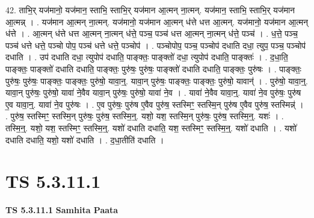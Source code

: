 \documentclass[17pt]{extarticle}
\begin{document}
42. ताभि॒र् यज॑मानो॒ यज॑मान॒ स्ताभि॒ स्ताभि॒र् यज॑मान आ॒त्मन् ना॒त्मन्. यज॑मान॒ स्ताभि॒ स्ताभि॒र् यज॑मान आ॒त्मन्न् । . यज॑मान आ॒त्मन् ना॒त्मन्. यज॑मानो॒ यज॑मान आ॒त्मन् ध॑त्ते धत्त आ॒त्मन्. यज॑मानो॒ यज॑मान आ॒त्मन् ध॑त्ते । . आ॒त्मन् ध॑त्ते धत्त आ॒त्मन् ना॒त्मन् ध॑त्ते॒ पञ्च॒ पञ्च॑ धत्त आ॒त्मन् ना॒त्मन् ध॑त्ते॒ पञ्च॑ । . ध॒त्ते॒ पञ्च॒ पञ्च॑ धत्ते धत्ते॒ पञ्चो पोप॒ पञ्च॑ धत्ते धत्ते॒ पञ्चोप॑ । . पञ्चोपोप॒ पञ्च॒ पञ्चोप॑ दधाति दधा॒ त्युप॒ पञ्च॒ पञ्चोप॑ दधाति । . उप॑ दधाति दधा॒ त्युपोप॑ दधाति॒ पाङ्क्तः॒ पाङ्क्तो॑ दधा॒ त्युपोप॑ दधाति॒ पाङ्क्तः॑ । . द॒धा॒ति॒ पाङ्क्तः॒ पाङ्क्तो॑ दधाति दधाति॒ पाङ्क्तः॒ पुरु॑षः॒ पुरु॑षः॒ पाङ्क्तो॑ दधाति दधाति॒ पाङ्क्तः॒ पुरु॑षः । . पाङ्क्तः॒ पुरु॑षः॒ पुरु॑षः॒ पाङ्क्तः॒ पाङ्क्तः॒ पुरु॑षो॒ यावा॒न्॒. यावा॒न् पुरु॑षः॒ पाङ्क्तः॒ पाङ्क्तः॒ पुरु॑षो॒ यावान्॑ । . पुरु॑षो॒ यावा॒न्॒. यावा॒न् पुरु॑षः॒ पुरु॑षो॒ यावा॑ ने॒वैव यावा॒न् पुरु॑षः॒ पुरु॑षो॒ यावा॑ ने॒व । . यावा॑ ने॒वैव यावा॒न्॒. यावा॑ ने॒व पुरु॑षः॒ पुरु॑ष ए॒व यावा॒न्॒. यावा॑ ने॒व पुरु॑षः । . ए॒व पुरु॑षः॒ पुरु॑ष ए॒वैव पुरु॑ष॒ स्तस्मिꣳ॒॒ स्तस्मि॒न् पुरु॑ष ए॒वैव पुरु॑ष॒ स्तस्मिन्न्॑ । . पुरु॑ष॒ स्तस्मिꣳ॒॒ स्तस्मि॒न् पुरु॑षः॒ पुरु॑ष॒ स्तस्मि॒न्॒. यशो॒ यश॒ स्तस्मि॒न् पुरु॑षः॒ पुरु॑ष॒ स्तस्मि॒न्॒. यशः॑ । . तस्मि॒न्॒. यशो॒ यश॒ स्तस्मिꣳ॒॒ स्तस्मि॒न्॒. यशो॑ दधाति दधाति॒ यश॒ स्तस्मिꣳ॒॒ स्तस्मि॒न्॒. यशो॑ दधाति । . यशो॑ दधाति दधाति॒ यशो॒ यशो॑ दधाति । . द॒धा॒तीति॑ दधाति । \newline
\pagebreak
{}

\section{ TS 5.3.11.1 }

\textbf{TS 5.3.11.1 } \newline
\textbf{Samhita Paata} \newline
\end{document}
